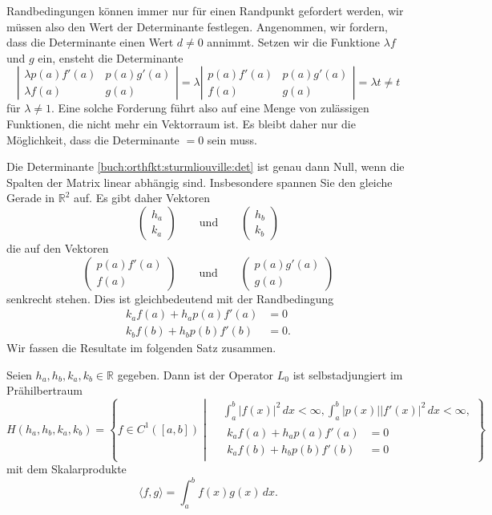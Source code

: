 Randbedingungen können immer nur für einen Randpunkt gefordert
werden, wir müssen also den Wert der Determinante festlegen.
Angenommen, wir fordern, dass die Determinante einen Wert
$d\ne 0$ annimmt. Setzen wir die Funktione $\lambda f$ und $g$ ein,
ensteht die Determinante
\[
\left|\begin{matrix}
\lambda p(a)f'(a)&p(a)g'(a) \\
\lambda f(a) &g(a)
\end{matrix}\right|
=
\lambda
\left|\begin{matrix}
p(a)f'(a)&p(a)g'(a) \\
f(a) &g(a)
\end{matrix}\right|
=
\lambda t \ne t
\]
für $\lambda \ne 1$.
Eine solche Forderung führt also auf eine Menge von zulässigen Funktionen,
die nicht mehr ein Vektorraum ist.
Es bleibt daher nur die Möglichkeit, dass die Determinante $=0$ sein muss.

Die Determinante 
\eqref{buch:orthfkt:sturmliouville:det}
ist genau dann Null, wenn die Spalten der Matrix linear abhängig sind.
Insbesondere spannen Sie den gleiche Gerade in $\mathbb{R}^2$ auf.
Es gibt daher Vektoren
\[
\begin{pmatrix}
h_a\\
k_a
\end{pmatrix}
\qquad\text{und}\qquad
\begin{pmatrix}
h_b\\
k_b
\end{pmatrix}
\]
die auf den Vektoren
\[
\begin{pmatrix}
p(a)f'(a)\\
f(a)
\end{pmatrix}
\qquad\text{und}\qquad
\begin{pmatrix}
p(a)g'(a)\\
g(a)
\end{pmatrix}
\]
senkrecht stehen.
Dies ist gleichbedeutend mit der Randbedingung
\begin{align*}
k_af(a) + h_ap(a)f'(a)&=0
\\
k_bf(b) + h_bp(b)f'(b)&=0.
\end{align*}
Wir fassen die Resultate im folgenden Satz zusammen.

\begin{satz}
Seien $h_a, h_b, k_a, k_b\in \mathbb{R}$ gegeben.
Dann ist der Operator $L_0$ ist selbstadjungiert im Prähilbertraum
\begin{equation}
H(h_a,h_b,k_a,k_b)
=
\left\{
f \in C^1([a,b])
\;
\left|
\;
\begin{aligned}
&\int_a^b |f(x)|^2\,dx < \infty,
\int_a^b |p(x)| |f'(x)|^2\,dx < \infty,
\\
&
\begin{aligned}
k_af(a) + h_ap(a)f'(a) &= 0 \\
k_af(b) + h_bp(b)f'(b) &= 0 
\end{aligned}
\end{aligned}
\right.
\right\}
\label{buch:orthfkt:sturmliouvill:ph}
\end{equation}
mit dem Skalarprodukte
\[
\langle f,g\rangle = \int_a^b f(x)g(x)\,dx.
\]
\end{satz}

